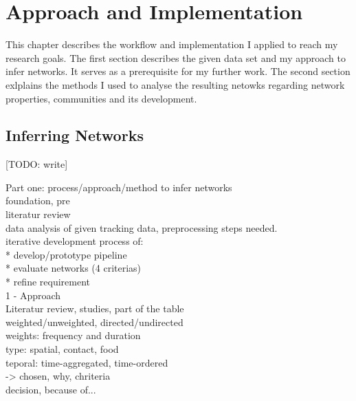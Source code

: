 \chapter{Approach and Implementation}
\label{ch:approach}

This chapter describes the workflow and implementation I applied to reach my research goals.
The first section describes the given data set and my approach to infer networks. It serves as a prerequisite for my further work.
The second section exlplains the methods I used to analyse the resulting netowks regarding network properties, communities and its development.

\section{Inferring Networks}
[TODO: write]

Part one: process/approach/method to infer networks\\
foundation, pre\\
literatur review\\
data analysis of given tracking data, preprocessing steps needed.\\
iterative development process of:\\
* develop/prototype pipeline\\
* evaluate networks (4 criterias)\\
* refine requirement\\


1 - Approach\\
Literatur review, studies, part of the table\\
weighted/unweighted, directed/undirected\\
weights: frequency and duration\\
type: spatial, contact, food\\
teporal: time-aggregated, time-ordered\\
-> chosen, why, chriteria\\
decision, because of...\\

